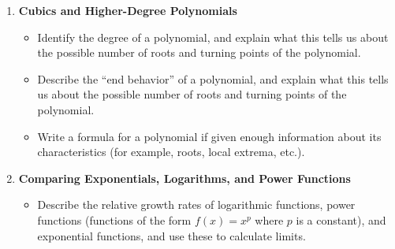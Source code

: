 \documentclass{article}
\begin{document}
\begin{enumerate}
\item \textbf{Cubics and Higher-Degree Polynomials} %
  \begin{itemize}
  \item Identify the degree of a polynomial, and explain what this tells us about the possible number of roots and turning points of the polynomial. 

  \item Describe the ``end behavior'' of a polynomial, and explain what this tells us about the possible number of roots and turning points of the polynomial.

  \item Write a formula for a polynomial if given enough information about its characteristics (for example, roots, local extrema, etc.).

  \end{itemize}

\item \textbf{Comparing Exponentials, Logarithms, and Power Functions} %
  \begin{itemize}
  \item Describe the relative growth rates of logarithmic functions, power functions (functions of the form $f(x) = x^p$ where $p$ is a constant), and exponential functions, and use these to calculate limits.    

  \end{itemize}

\end{enumerate}
\end{document}
